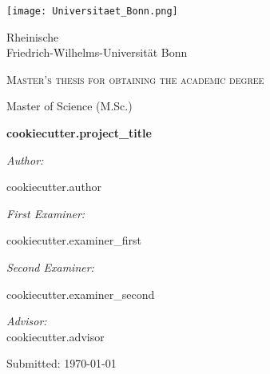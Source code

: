 \begin{titlepage}
	\centering
     
    \texttt{[image: Universitaet\_Bonn.png]}\par
    \vspace{1cm}
	{\textsc\LARGE Rheinische\\[5mm] Friedrich-Wilhelms-Universität Bonn}\par
	\vspace{1.5cm}
	{\scshape Master's thesis for obtaining the academic degree \par\glqq Master of Science (M.Sc.)\grqq  \par}
	\vspace{2cm}
	
	{\Large\bfseries {{cookiecutter.project_title}} }\par
	\vspace{1.4cm}
	
    \begin{minipage}[t]{0.4\textwidth}
        \begin{flushleft} \large
            \emph{Author:}\par
            {{cookiecutter.author}}
        \end{flushleft}        
    \end{minipage}
    
    \begin{minipage}[t]{0.5\textwidth}
        \begin{flushright} \large
            \emph{First Examiner:}\par
            {{cookiecutter.examiner_first}}\par\vspace{0.5cm}
            \emph{Second Examiner:}\par
            {{cookiecutter.examiner_second}}\par\vspace{0.5cm}

            \emph{Advisor:} \\
            {{cookiecutter.advisor}}\par\vspace{0.5cm}
        \end{flushright}
    \end{minipage}

    \vfill
	
    {\large Submitted:\hspace{1cm} \today}
\end{titlepage}
